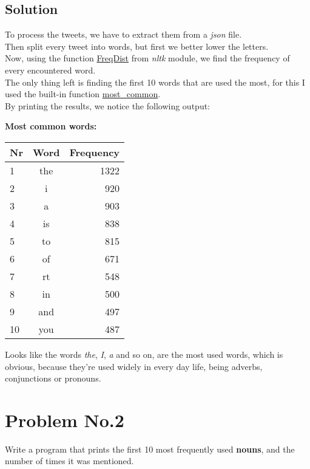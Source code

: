 \documentclass{article}
\begin{document}
  \subsection{Solution}
    To process the tweets, we have to extract them from a \emph{json} file.\\
    Then split every tweet into words, but first we better lower the letters.\\
    Now, using the function \underline{FreqDist} from \emph{nltk} module,
    we find the frequency of every encountered word.\\
    The only thing left is finding the first 10 words that are used the most,
    for this I used the built-in function \underline{most\_common}.\\
    By printing the results, we notice the following output:\\

    \begin{table}[H]
      \centering
      \textbf{Most common words:}\\
      \begin{tabular}{l|c|r}
        \hline
        Nr & Word & Frequency \\ \hline
        1 & the & 1322 \\ \hline
        2 & i & 920 \\ \hline
        3 & a & 903 \\ \hline
        4 & is & 838 \\ \hline
        5 & to & 815 \\ \hline
        6 & of & 671 \\ \hline
        7 & rt & 548 \\ \hline
        8 & in & 500 \\ \hline
        9 & and & 497 \\ \hline
        10 & you & 487 \\
      \end{tabular}
    \end{table}

    Looks like the words \emph{the}, \emph{I}, \emph{a} and so on, are the most used words,
    which is obvious, because they're used widely in every day life, being
    adverbs, conjunctions or pronouns.\\

  \newpage


  \section{Problem No.2}
    Write a program that prints the first 10 most frequently used \textbf{nouns},
    and the number of times it was mentioned.
\end{document}
